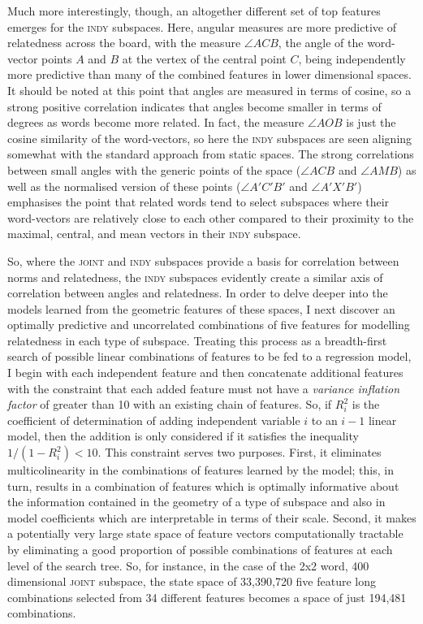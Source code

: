 Much more interestingly, though, an altogether different set of top features emerges for the \textsc{indy} subspaces.  Here, angular measures are more predictive of relatedness across the board, with the measure $\angle ACB$, the angle of the word-vector points $A$ and $B$ at the vertex of the central point $C$, being independently more predictive than many of the combined features in lower dimensional spaces.  It should be noted at this point that angles are measured in terms of cosine, so a strong positive correlation indicates that angles become smaller in terms of degrees as words become more related.  In fact, the measure $\angle AOB$ is just the cosine similarity of the word-vectors, so here the \textsc{indy} subspaces are seen aligning somewhat with the standard approach from static spaces.  The strong correlations between small angles with the generic points of the space ($\angle ACB$ and $\angle AMB$) as well as the normalised version of these points ($\angle A'C'B'$ and $\angle A'X'B'$) emphasises the point that related words tend to select subspaces where their word-vectors are relatively close to each other compared to their proximity to the maximal, central, and mean vectors in their \textsc{indy} subspace.

So, where the \textsc{joint} and \textsc{indy} subspaces provide a basis for correlation between norms and relatedness, the \textsc{indy} subspaces evidently create a similar axis of correlation between angles and relatedness.  In order to delve deeper into the models learned from the geometric features of these spaces, I next discover an optimally predictive and uncorrelated combinations of five features for modelling relatedness in each type of subspace.  Treating this process as a breadth-first search of possible linear combinations of features to be fed to a regression model, I begin with each independent feature and then concatenate additional features with the constraint that each added feature must not have a \emph{variance inflation factor} \cite{OBrien2007} of greater than 10 with an existing chain of features.  So, if $R_{i}^{2}$ is the coefficient of determination of adding independent variable $i$ to an $i-1$ linear model, then the addition is only considered if it satisfies the inequality $1/(1-R_{i}^{2}) < 10$. This constraint serves two purposes.  First, it eliminates multicolinearity in the combinations of features learned by the model; this, in turn, results in a combination of features which is optimally informative about the information contained in the geometry of a type of subspace and also in model coefficients which are interpretable in terms of their scale.  Second, it makes a potentially very large state space of feature vectors computationally tractable by eliminating a good proportion of possible combinations of features at each level of the search tree.  So, for instance, in the case of the 2x2 word, 400 dimensional \textsc{joint} subspace, the state space of 33,390,720 five feature long combinations selected from 34 different features becomes a space of just 194,481 combinations.

